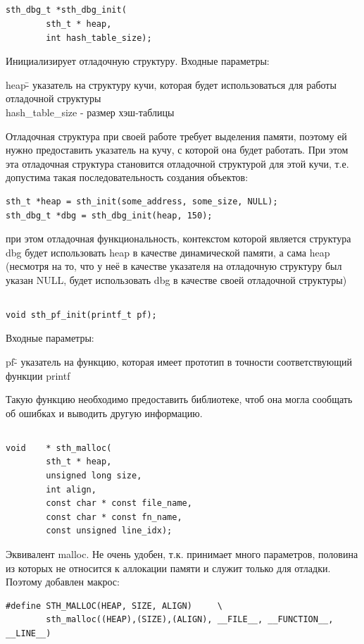 \documentclass{article}
\begin{document}
\subsection*{}
\begin{lstlisting}
sth_dbg_t *sth_dbg_init(
        sth_t * heap, 
        int hash_table_size);
\end{lstlisting}
Инициализирует отладочную структуру.
Входные параметры:
\begin{tabbing}
heap\quad\=    - указатель на структуру кучи, которая будет использоваться для работы отладочной структуры\\ 
hash\_table\_size \>        - размер хэш-таблицы
\end{tabbing}
Отладочная структура при своей работе требует выделения памяти, поэтому ей нужно предоставить указатель на кучу, с которой она будет работать. При этом эта отладочная структура становится отладочной структурой для этой кучи, т.е. допустима такая последовательность создания объектов:
\begin{lstlisting}
sth_t *heap = sth_init(some_address, some_size, NULL);
sth_dbg_t *dbg = sth_dbg_init(heap, 150);
\end{lstlisting}
при этом отладочная функциональность, контекстом которой является структура dbg будет использовать heap в качестве динамической памяти, а сама heap (несмотря на то, что у неё в качестве указателя на отладочную структуру был указан NULL, будет использовать dbg в качестве своей отладочной структуры)

\subsection*{}
\begin{lstlisting}
void sth_pf_init(printf_t pf);
\end{lstlisting}
Входные параметры:
\begin{tabbing}
pf\quad\=    - указатель на функцию, которая имеет прототип в точности соответствующий функции printf\\ 
\end{tabbing}
Такую функцию необходимо предоставить библиотеке, чтоб она могла сообщать об ошибках и выводить другую информацию.

\subsection*{}
\begin{lstlisting}
void    * sth_malloc(
        sth_t * heap, 
        unsigned long size, 
        int align, 
        const char * const file_name, 
        const char * const fn_name, 
        const unsigned line_idx);
\end{lstlisting}
Эквивалент malloc. Не очень удобен, т.к. принимает много параметров, половина из которых не относится к аллокации памяти и служит только для отладки. Поэтому добавлен макрос:
\begin{lstlisting}
#define STH_MALLOC(HEAP, SIZE, ALIGN)     \
        sth_malloc((HEAP),(SIZE),(ALIGN), __FILE__, __FUNCTION__, __LINE__)
\end{lstlisting}
\end{document}
